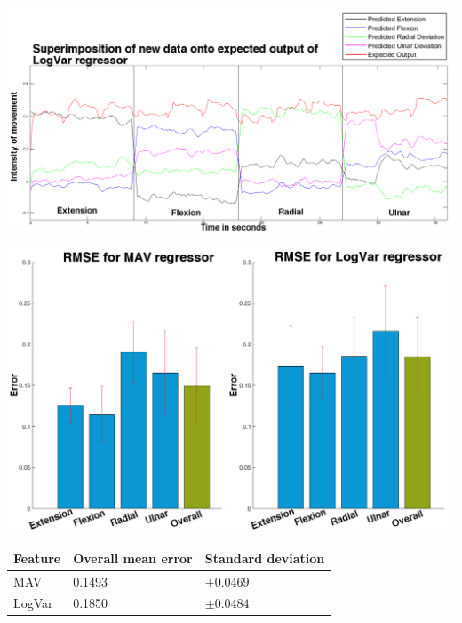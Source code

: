 \documentclass[landscape,a0paper,fontscale=0.375]{baposter} %
\begin{document}
\begin{poster}
{\begin{multicols}{2}
\begin{center}
	\includegraphics[width=1\linewidth]{NewSuperPoisonLogVarNewData}
\end{center} %
	
	
\begin{center}
	\includegraphics[width=1\linewidth]{RMSEBarPlotNewData}
\end{center}
	
	\begin{center}
		\begin{tabular}{l l l}
			\toprule
			\textbf{Feature} & \textbf{Overall mean error} & \textbf{Standard deviation}\\
			\midrule
			MAV & 0.1493 & $\pm 0.0469$ \\
			LogVar & 0.1850 & $\pm 0.0484$ \\
			\bottomrule
		\end{tabular}
	\end{center}


\end{multicols}}
\end{poster}
\end{document}
